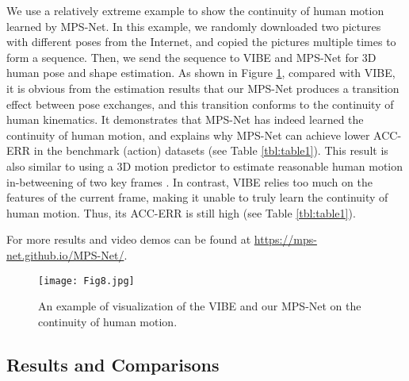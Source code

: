 \documentclass[10pt,twocolumn,letterpaper]{article}
\begin{document}
 We use a relatively extreme example to show the continuity of human motion learned by MPS-Net. In this example, we randomly downloaded two pictures with different poses from the Internet, and copied the pictures multiple times to form a sequence. Then, we send the sequence to VIBE \cite{Kocabas2020VIBEVI} and MPS-Net for 3D human pose and shape estimation. As shown in Figure \ref{fig:fig8}, compared with VIBE, it is obvious from the estimation results that our MPS-Net produces a transition effect between pose exchanges, and this transition conforms to the continuity of human kinematics. It demonstrates that MPS-Net has indeed learned the continuity of human motion, and explains why MPS-Net can achieve lower ACC-ERR in the benchmark (action) datasets (see Table \ref{tbl:table1}). This result is also similar to using a 3D motion predictor to estimate reasonable human motion in-betweening of two key frames \cite{10.1145/3386569.3392480}. In contrast, VIBE relies too much on the features of the current frame, making it unable to truly learn the continuity of human motion. Thus, its ACC-ERR is still high (see Table \ref{tbl:table1}).

For more results and video demos can be found at \url{https://mps-net.github.io/MPS-Net/}.\vspace{-6pt}

\begin{figure}[t]
  \centering
  \texttt{[image: Fig8.jpg]}\vspace{-10pt}
  \caption{An example of visualization of the VIBE \cite{Kocabas2020VIBEVI} and our MPS-Net on the continuity of human motion.}\vspace{-13pt}
  \label{fig:fig8}
\end{figure}



\iffalse
\subsection{Results and Comparisons}
\end{document}
